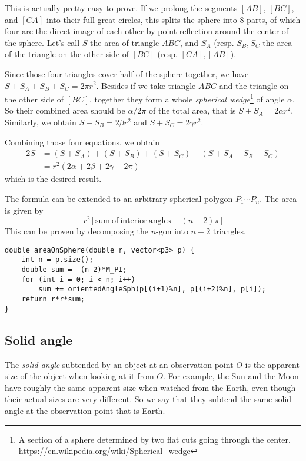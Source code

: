 This is actually pretty easy to prove. If we prolong the segments $[AB]$, $[BC]$, and $[CA]$ into their full great-circles, this splits the sphere into 8 parts, of which four are the direct image of each other by point reflection around the center of the sphere. Let's call $S$ the area of triangle $ABC$, and $S_A$ (resp. $S_B,S_C$ the area of the triangle on the other side of $[BC]$ (resp. $[CA],[AB]$).


Since those four triangles cover half of the sphere together, we have $S+S_A+S_B+S_C = 2\pi r^2$.
Besides if we take triangle $ABC$ and the triangle on the other side of $[BC]$, together they form a whole \emph{spherical wedge}\footnote{A section of a sphere determined by two flat cuts going through the center. \url{https://en.wikipedia.org/wiki/Spherical_wedge}} of angle $\alpha$.
So their combined area should be $\alpha/2\pi$ of the total area, that is $S+S_A = 2\alpha r^2$.
Similarly, we obtain $S+S_B = 2\beta r^2$ and $S+S_C = 2\gamma r^2$.

Combining those four equations, we obtain
\begin{align*}
2S &= (S+S_A) + (S+S_B) + (S+S_C) - (S+S_A+S_B+S_C)\\
&= r^2(2\alpha + 2\beta + 2\gamma - 2\pi)
\end{align*}
which is the desired result.

The formula can be extended to an arbitrary spherical polygon $P_1\cdots P_n$. The area is given by 
\[r^2\,\big[\,\mathrm{sum\ of\ interior\ angles} - (n - 2)\pi\,\big]\]
This can be proven by decomposing the $n$-gon into $n-2$ triangles.

\begin{lstlisting}
double areaOnSphere(double r, vector<p3> p) {
    int n = p.size();
    double sum = -(n-2)*M_PI;
    for (int i = 0; i < n; i++)
        sum += orientedAngleSph(p[(i+1)%n], p[(i+2)%n], p[i]);
    return r*r*sum;
}
\end{lstlisting}

\subsection{Solid angle}
The \emph{solid angle} subtended by an object at an observation point $O$ is the apparent size of the object when looking at it from $O$. For example, the Sun and the Moon have roughly the same apparent size when watched from the Earth, even though their actual sizes are very different. So we say that they subtend the same solid angle at the observation point that is Earth.

